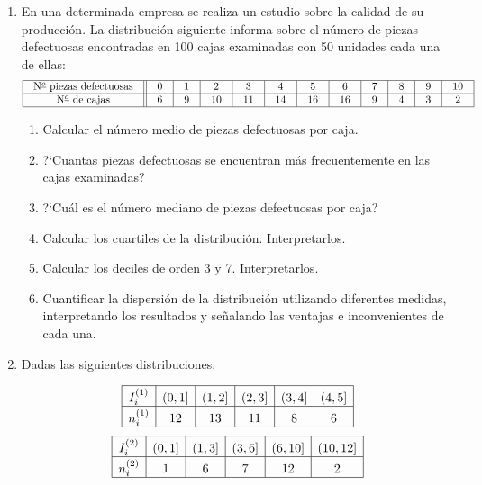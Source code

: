 \documentclass[11pt]{book}
\begin{document}
\begin{enumerate}
\vskip 0.4cm  \item En una determinada empresa se realiza un estudio sobre la calidad de su
     producci{\'o}n. La distribuci{\'o}n siguiente informa sobre el n{\'u}mero de  piezas
     defectuosas encontradas en 100 cajas examinadas con 50 unidades cada una
     de ellas:
$$\setlength{\arraycolsep}{10pt}
    \begin{array}{|c||c|c|c|c|c|c|c|c|c|c|c|} \hline
\mbox{N${}^{\underline{o}}$ piezas defectuosas} & 0 & 1 & 2  & 3
& 4  & 5  & 6  & 7 & 8 & 9 & 10 \\ \hline
\mbox{N${}^{\underline{o}}$ de cajas}           & 6 & 9 & 10 & 11
& 14 & 16 & 16 & 9 & 4 & 3 & 2 \\ \hline
   \end{array}
$$

  \begin{enumerate}
     \item Calcular el n{\'u}mero medio de piezas defectuosas por caja.
     \item ?`Cuantas piezas defectuosas se encuentran m{\'a}s frecuentemente en las
        cajas examinadas?
     \item ?`Cu{\'a}l es el n{\'u}mero mediano de piezas defectuosas por caja?
     \item Calcular los cuartiles de la distribuci{\'o}n. Interpretarlos.
     \item Calcular los deciles de orden 3 y 7. Interpretarlos.
     \item Cuantificar la dispersi{\'o}n de la  distribuci{\'o}n utilizando diferentes
           medidas, interpretando los resultados  y se{\~n}alando las ventajas e
           inconvenientes de cada una.
   \end{enumerate}
 \vskip 0.3cm \item Dadas las siguientes distribuciones:

$$\setlength{\extrarowheight}{4pt}
  \begin{array}{|c|c|c|c|c|c|} \hline
      I_{i}^{(1)} & (0,1] & (1,2] & (2,3] & (3,4] & (4,5] \\ \hline
      n_{i}^{(1)} & 12  & 13  &  11 &  8  &  6  \\ \hline
  \end{array}
$$
$$\setlength{\extrarowheight}{4pt}
  \begin{array}{|c|c|c|c|c|c|} \hline
      I_{i}^{(2)} & (0,1] & (1,3] & (3,6] & (6,10] & (10,12] \\ \hline
      n_{i}^{(2)} &  1   &  6  &  7  &  12  &  2  \\ \hline
  \end{array}
$$






\end{enumerate}
\end{document}
